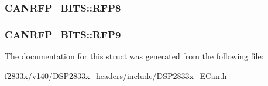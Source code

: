 \subsubsection[{R\+F\+P8}]{ C\+A\+N\+R\+F\+P\+\_\+\+B\+I\+T\+S\+::\+R\+F\+P8}\label{struct_c_a_n_r_f_p___b_i_t_s_adce2fcd2af57d15820e10f476f261666}
\hypertarget{struct_c_a_n_r_f_p___b_i_t_s_a39d9f8ba7b41a3d18bda8a70eb6ea2d4}{}
\subsubsection[{R\+F\+P9}]{ C\+A\+N\+R\+F\+P\+\_\+\+B\+I\+T\+S\+::\+R\+F\+P9}\label{struct_c_a_n_r_f_p___b_i_t_s_a39d9f8ba7b41a3d18bda8a70eb6ea2d4}


The documentation for this struct was generated from the following file\+:\begin{DoxyCompactItemize}
\item 
f2833x/v140/\+D\+S\+P2833x\+\_\+headers/include/\hyperlink{_d_s_p2833x___e_can_8h}{D\+S\+P2833x\+\_\+\+E\+Can.\+h}\end{DoxyCompactItemize}
